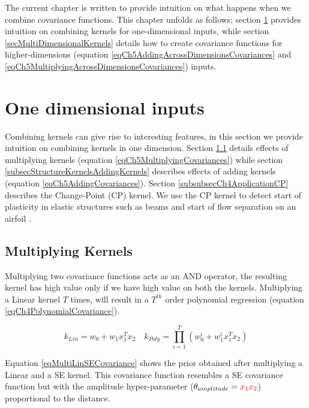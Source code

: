 The current chapter is written to provide intuition on what happens when we combine covariance functions. This chapter unfolds as follows; section \ref{secSingleDimension} provides intuition on combining kernels for one-dimensional inputs, while section \ref{secMultiDimensionalKernels} details how to create covariance functions for higher-dimensions (equation \ref{eqCh5AddingAcrossDimensionsCovariances} and \ref{eqCh5MultiplyingAcrossDimensionsCovariances}) inputs. 

\section{One dimensional inputs}\label{secSingleDimension}
Combining kernels can give rise to interesting features, in this section we provide intuition on combining kernels in one dimension. Section \ref{subsecStructureKernelsMultiplyingKernels} details effects of multiplying kernels (equation \ref{eqCh5MultiplyingCovariances}) while section \ref{subsecStructureKernelsAddingKernels} describes effects of adding kernels (equation \ref{eqCh5AddingCovariances}). Section \ref{subsubsecCh4ApplicationCP} describes the Change-Point (CP) kernel. We use the CP kernel to detect start of plasticity in elastic structures such as beams and start of flow separation on an airfoil \cite{chiplunkar:hal-01555401}. 


\subsection{Multiplying Kernels} \label{subsecStructureKernelsMultiplyingKernels}
Multiplying two covariance functions acts as an AND operator, the resulting kernel has high value only if we have high value on both the kernels. Multiplying a Linear kernel $T$ times, will result in a $T^{th}$ order polynomial regression (equation \ref{eqCh4PolynomialCovariance}). 

\begin{equation}\label{eqCh4PolynomialCovariance}
k_{Lin} = w_{0} + w_{1}x_{1}^T x_{2} \quad k_{Poly} = \prod_{i=1}^{T} \left (w_{0}^{i} + w_{1}^{i}x_{1}^T x_{2} \right)
\end{equation}

Equation \ref{eqMultiLinSECovariance} shows the prior obtained after multiplying a Linear and a SE kernel. This covariance function resembles a SE covariance function but with the amplitude hyper-parameter ($\theta_{amplitude} = \textcolor{red}{x_{1}x_{2}}$) proportional to the  distance. 

